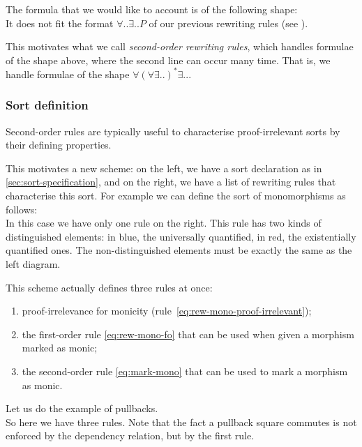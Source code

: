 \documentclass{article}
\begin{document}
The formula that we would like to account is of the following shape:
\[

\] 
It does not fit the format $∀ .. ∃ .. P$ of our previous rewriting rules (see ).

This motivates what we call \emph{second-order rewriting rules}, which handles formulae of the shape above, where 
the second line can occur many time. That is, we handle formulae of the shape $∀ (∀ ∃ .. )^* ∃ .. $.
\subsubsection{Sort definition}
\label{sec:sort-definition}
Second-order rules are typically useful to characterise proof-irrelevant sorts by their defining properties.

This motivates a new scheme: on the left, we have a sort declaration as in \ref{sec:sort-specification}, and on the right, we have a list of rewriting rules that characterise this sort.
For example we can define the sort of monomorphisms as follows:
\[

\]
In this case we have only one rule on the right.
This rule has two kinds of distinguished elements: in blue, the universally quantified, in red, the existentially quantified ones. The non-distinguished elements must be exactly the same as the left diagram.

This scheme actually defines three rules at once: 
\begin{enumerate}
    \item proof-irrelevance for monicity (rule~\eqref{eq:rew-mono-proof-irrelevant});
    \item the first-order rule \eqref{eq:rew-mono-fo} that can be 
    used when given a morphism marked as monic;
    \item the second-order rule \eqref{eq:mark-mono} that can be used to mark a morphism as monic.
\end{enumerate}


Let us do the example of pullbacks.
\[

\]
So here we have three rules. Note that the fact a pullback square commutes is not enforced by the dependency relation, but by the first rule. 
\end{document}
